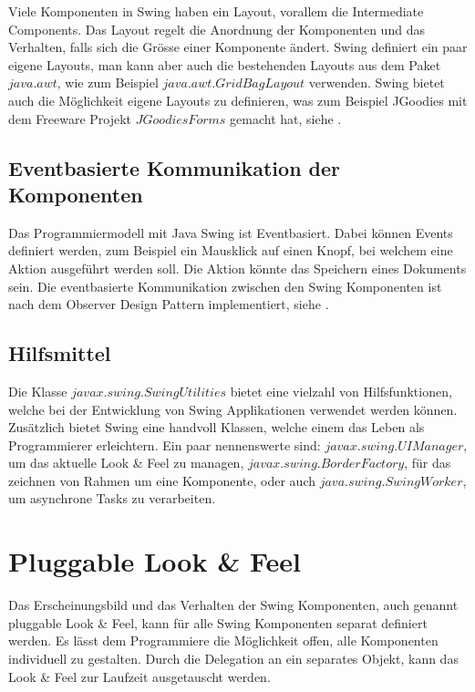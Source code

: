   Viele Komponenten in Swing haben ein Layout, vorallem die Intermediate
  Components. Das Layout regelt die Anordnung der Komponenten und das Verhalten,
  falls sich die Grösse einer Komponente ändert. Swing definiert ein paar eigene
  Layouts, man kann aber auch die bestehenden Layouts aus dem Paket
  \(java.awt\), wie zum Beispiel \(java.awt.GridBagLayout\) verwenden. Swing
  bietet auch die Möglichkeit eigene Layouts zu definieren, was zum Beispiel
  JGoodies mit dem Freeware Projekt \(JGoodies Forms\) gemacht hat, siehe
  \cite{JGoodiesForms}.
    
  \subsection{Eventbasierte Kommunikation der Komponenten}
  
  Das Programmiermodell mit Java Swing ist Eventbasiert. Dabei können Events
  definiert werden, zum Beispiel ein Mausklick auf einen Knopf, bei welchem
  eine Aktion ausgeführt werden soll. Die Aktion könnte das Speichern eines
  Dokuments sein. Die eventbasierte Kommunikation zwischen den Swing
  Komponenten ist nach dem Observer Design Pattern implementiert, siehe
  \cite{ObserverDesignPattern}.
  
  \subsection{Hilfsmittel}
  
  Die Klasse \(javax.swing.SwingUtilities\) bietet eine vielzahl von
  Hilfsfunktionen, welche bei der Entwicklung von Swing Applikationen verwendet
  werden können. Zusätzlich bietet Swing eine handvoll Klassen, welche einem
  das Leben als Programmierer erleichtern. Ein paar nennenswerte sind:
  \(javax.swing.UIManager\), um das aktuelle Look \& Feel zu managen,
  \(javax.swing.BorderFactory\), für das zeichnen von Rahmen um eine
  Komponente, oder auch \(java.swing.SwingWorker\), um asynchrone Tasks
  zu verarbeiten.
  
  \section{Pluggable Look \& Feel}
  
  Das Erscheinungsbild und das Verhalten der Swing Komponenten, auch genannt
  pluggable Look \& Feel, kann für alle Swing Komponenten separat definiert
  werden. Es lässt dem Programmiere die Möglichkeit offen, alle Komponenten
  individuell zu gestalten. Durch die Delegation an ein separates Objekt, kann
  das Look \& Feel zur Laufzeit ausgetauscht werden.
  

